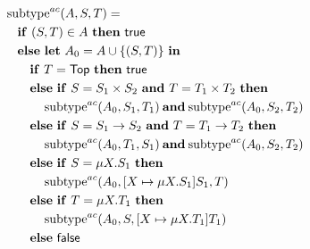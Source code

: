 \begin{center}
\centering
\begin{minipage}{0.93\linewidth}
\[
\begin{aligned}
&\operatorname{subtype}^{ac}(A,S,T)={}\\
&\quad \mathbf{if}\ (S,T)\in A\ \mathbf{then}\ \mathsf{true}\\
&\quad \mathbf{else}\ \mathbf{let}\ A_0=A\cup\{(S,T)\}\ \mathbf{in}\\
&\qquad \mathbf{if}\ T=\tapltype{Top}\ \mathbf{then}\ \mathsf{true}\\
&\qquad \mathbf{else\ if}\ S=S_1\times S_2\ \mathbf{and}\ T=T_1\times T_2\ \mathbf{then}\\
&\qquad\quad \operatorname{subtype}^{ac}(A_0,S_1,T_1)
       \mathbin{\mathbf{and}}
       \operatorname{subtype}^{ac}(A_0,S_2,T_2)\\
&\qquad \mathbf{else\ if}\ S=S_1\to S_2\ \mathbf{and}\ T=T_1\to T_2\ \mathbf{then}\\
&\qquad\quad \operatorname{subtype}^{ac}(A_0,T_1,S_1)
       \mathbin{\mathbf{and}}
       \operatorname{subtype}^{ac}(A_0,S_2,T_2)\\
&\qquad \mathbf{else\ if}\ S=\mu X.S_1\ \mathbf{then}\\
&\qquad\quad \operatorname{subtype}^{ac}(A_0,[X\mapsto\mu X.S_1]S_1,T)\\
&\qquad \mathbf{else\ if}\ T=\mu X.T_1\ \mathbf{then}\\
&\qquad\quad \operatorname{subtype}^{ac}(A_0,S,[X\mapsto\mu X.T_1]T_1)\\
&\qquad \mathbf{else}\ \mathsf{false}
\end{aligned}
\]
\end{minipage}
\label{fig:21-5}
\end{center}


